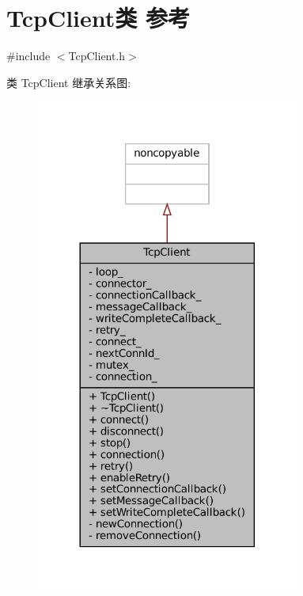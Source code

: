 \hypertarget{classmuduo_1_1TcpClient}{}\section{Tcp\+Client类 参考}
\label{classmuduo_1_1TcpClient}


{\ttfamily \#include $<$Tcp\+Client.\+h$>$}



类 Tcp\+Client 继承关系图\+:
\nopagebreak
\begin{figure}[H]
\begin{center}
\leavevmode
\includegraphics[width=245pt]{classmuduo_1_1TcpClient__inherit__graph}
\end{center}
\end{figure}


